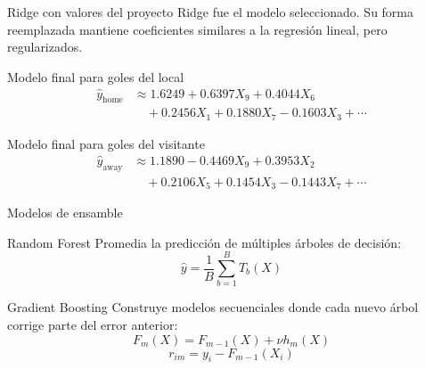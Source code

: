 \documentclass[aspectratio=169]{beamer}
\begin{document}
\begin{frame}[t]{Ridge con valores del proyecto}
\scriptsize
\justifying
Ridge fue el modelo seleccionado. Su forma reemplazada mantiene coeficientes similares a la regresión lineal, pero regularizados.

\vspace{0.1cm}
\begin{block}{Modelo final para goles del local}
\[
\begin{aligned}
\hat{y}_{\text{home}}
&\approx
1.6249+0.6397X_9+0.4044X_6\\
&\quad +0.2456X_1+0.1880X_7-0.1603X_3+\cdots
\end{aligned}
\]
\end{block}

\begin{block}{Modelo final para goles del visitante}
\[
\begin{aligned}
\hat{y}_{\text{away}}
&\approx
1.1890-0.4469X_9+0.3953X_2\\
&\quad +0.2106X_5+0.1454X_3-0.1443X_7+\cdots
\end{aligned}
\]
\end{block}
\end{frame}

\begin{frame}{Modelos de ensamble}
\small
\begin{block}{Random Forest}
Promedia la predicción de múltiples árboles de decisión:
\[
\hat{y} = \frac{1}{B}\sum_{b=1}^{B}T_b(X)
\]
\end{block}

\vspace{0.15cm}
\begin{block}{Gradient Boosting}
Construye modelos secuenciales donde cada nuevo árbol corrige parte del error anterior:
\[
F_m(X)=F_{m-1}(X)+\nu h_m(X)
\]
\[
r_{im}=y_i-F_{m-1}(X_i)
\]
\end{block}
\end{frame}
\end{document}
